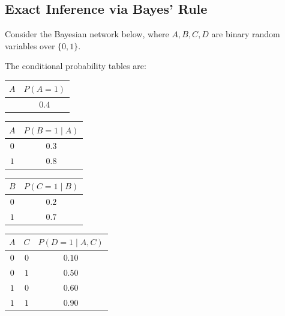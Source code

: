 \subsection{\points[8] Exact Inference via Bayes' Rule}

Consider the Bayesian network below, where $A, B, C, D$ are binary random variables over
$\{0,1\}$.

\begin{figure}[H]
\centering
{}
\end{figure}

\noindent The conditional probability tables are:

\begin{table}[H]
\centering
\begin{tabular}{|c|c|}
\hline
$A$ & $P(A=1)$ \\\hline
    & $0.4$    \\\hline
\end{tabular}
\hspace{8mm}
\begin{tabular}{|c|c|}
\hline
$A$ & $P(B=1\mid A)$ \\\hline
$0$ & $0.3$          \\\hline
$1$ & $0.8$          \\\hline
\end{tabular}
\hspace{8mm}
\begin{tabular}{|c|c|}
\hline
$B$ & $P(C=1\mid B)$ \\\hline
$0$ & $0.2$          \\\hline
$1$ & $0.7$          \\\hline
\end{tabular}
\end{table}

\begin{table}[H]
\centering
\begin{tabular}{|c|c|c|}
\hline
$A$ & $C$ & $P(D=1\mid A,C)$ \\\hline
$0$ & $0$ & $0.10$           \\\hline
$0$ & $1$ & $0.50$           \\\hline
$1$ & $0$ & $0.60$           \\\hline
$1$ & $1$ & $0.90$           \\\hline
\end{tabular}
\end{table}

